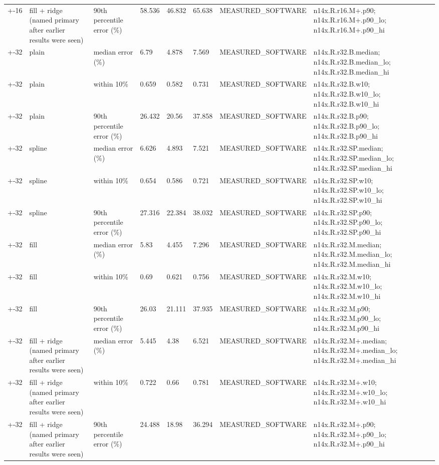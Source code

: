 \begin{table}[t]
\begin{tabular}{llllllll}
+-16 & fill + ridge (named primary after earlier results were seen) & 90th percentile error (\%) & 58.536 & 46.832 & 65.638 & MEASURED\_SOFTWARE & n14x.R.r16.M+.p90; n14x.R.r16.M+.p90\_lo; n14x.R.r16.M+.p90\_hi \\
+-32 & plain & median error (\%) & 6.79 & 4.878 & 7.569 & MEASURED\_SOFTWARE & n14x.R.r32.B.median; n14x.R.r32.B.median\_lo; n14x.R.r32.B.median\_hi \\
+-32 & plain & within 10\% & 0.659 & 0.582 & 0.731 & MEASURED\_SOFTWARE & n14x.R.r32.B.w10; n14x.R.r32.B.w10\_lo; n14x.R.r32.B.w10\_hi \\
+-32 & plain & 90th percentile error (\%) & 26.432 & 20.56 & 37.858 & MEASURED\_SOFTWARE & n14x.R.r32.B.p90; n14x.R.r32.B.p90\_lo; n14x.R.r32.B.p90\_hi \\
+-32 & spline & median error (\%) & 6.626 & 4.893 & 7.521 & MEASURED\_SOFTWARE & n14x.R.r32.SP.median; n14x.R.r32.SP.median\_lo; n14x.R.r32.SP.median\_hi \\
+-32 & spline & within 10\% & 0.654 & 0.586 & 0.721 & MEASURED\_SOFTWARE & n14x.R.r32.SP.w10; n14x.R.r32.SP.w10\_lo; n14x.R.r32.SP.w10\_hi \\
+-32 & spline & 90th percentile error (\%) & 27.316 & 22.384 & 38.032 & MEASURED\_SOFTWARE & n14x.R.r32.SP.p90; n14x.R.r32.SP.p90\_lo; n14x.R.r32.SP.p90\_hi \\
+-32 & fill & median error (\%) & 5.83 & 4.455 & 7.296 & MEASURED\_SOFTWARE & n14x.R.r32.M.median; n14x.R.r32.M.median\_lo; n14x.R.r32.M.median\_hi \\
+-32 & fill & within 10\% & 0.69 & 0.621 & 0.756 & MEASURED\_SOFTWARE & n14x.R.r32.M.w10; n14x.R.r32.M.w10\_lo; n14x.R.r32.M.w10\_hi \\
+-32 & fill & 90th percentile error (\%) & 26.03 & 21.111 & 37.935 & MEASURED\_SOFTWARE & n14x.R.r32.M.p90; n14x.R.r32.M.p90\_lo; n14x.R.r32.M.p90\_hi \\
+-32 & fill + ridge (named primary after earlier results were seen) & median error (\%) & 5.445 & 4.38 & 6.521 & MEASURED\_SOFTWARE & n14x.R.r32.M+.median; n14x.R.r32.M+.median\_lo; n14x.R.r32.M+.median\_hi \\
+-32 & fill + ridge (named primary after earlier results were seen) & within 10\% & 0.722 & 0.66 & 0.781 & MEASURED\_SOFTWARE & n14x.R.r32.M+.w10; n14x.R.r32.M+.w10\_lo; n14x.R.r32.M+.w10\_hi \\
+-32 & fill + ridge (named primary after earlier results were seen) & 90th percentile error (\%) & 24.488 & 18.98 & 36.294 & MEASURED\_SOFTWARE & n14x.R.r32.M+.p90; n14x.R.r32.M+.p90\_lo; n14x.R.r32.M+.p90\_hi \\

\end{tabular}
\end{table}
